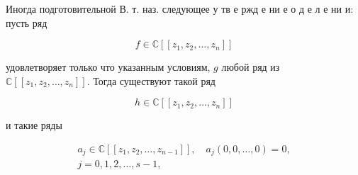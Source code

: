 \documentclass[10pt]{article}
\begin{document}
Иногда подготовительной В. т. наз. следующее у тв е ржд е ни е о д е л е ни и: пусть ряд



\[

f \in \mathbb{C}\left[\left[z_{1}, z_{2}, \ldots, z_{n}\right]\right]

\]



удовлетворяет только что указанным условиям, $g$ любой ряд из $\mathbb{C}\left[\left[z_{1}, z_{2}, \ldots, z_{n}\right]\right]$. Тогда существуют такой ряд



\[

h \in \mathbb{C}\left[\left[z_{1}, z_{2}, \ldots, z_{n}\right]\right]

\]



и такие ряды



\[

\begin{gathered}

a_{j} \in \mathbb{C}\left[\left[z_{1}, z_{2}, \ldots, z_{n-1}\right]\right], \quad a_{j}(0,0, \ldots, 0)=0, \\

j=0,1,2, \ldots, s-1,

\end{gathered}

\]
\end{document}
